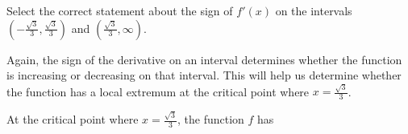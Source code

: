\documentclass{ximera}
\begin{document}
\begin{example}
\begin{explanation}
\begin{question}
  \begin{multipleChoice}
           \end{multipleChoice}
  \end{question}
  \begin{question}
Select the correct  statement about the sign of $f'(x)$ on the intervals  $(-\frac{\sqrt{3}}{3},\frac{\sqrt{3}}{3})$ and  $(\frac{\sqrt{3}}{3},\infty)$. \\
 
  \begin{multipleChoice}
  \end{multipleChoice}
  \end{question}
Again, the sign of the derivative on an interval determines whether the function is increasing or decreasing on that interval. This will help us determine whether the function has a local extremum at the critical point  where $x=\frac{\sqrt{3}}{3}$. \\
  \begin{question}

At the critical point where $x=\frac{\sqrt{3}}{3}$, the function $f$ has  \\
 

\end{question}
\end{explanation}
\end{example}
\end{document}
